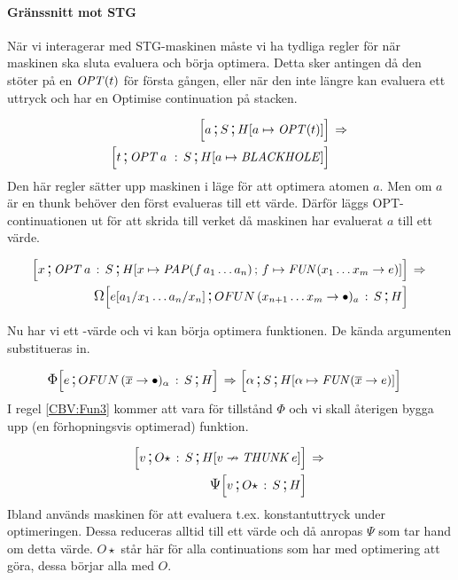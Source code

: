 \documentclass[../Optimise]{subfiles}
\begin{document}
\paragraph{Gränssnitt mot STG}
När vi interagerar med STG-maskinen måste vi ha tydliga regler
för när maskinen ska sluta evaluera och börja optimera. Detta sker
antingen då den stöter på en $\OPT t$ för första gången, eller när den
inte längre kan evaluera ett uttryck och har en Optimise continuation
på stacken.

\begin{align}
\mc aS{\heap a{\OPT t}} & \rulesep\\
\mc t{\cOPT{a\,}S}{\heap a{\BH}} \nonumber
\end{align}
Den här regler sätter upp maskinen i läge för att optimera atomen $a$. Men om $a$
är en thunk behöver den först evalueras till ett värde. Därför läggs
OPT-continuationen ut för att skrida till verket då maskinen har evaluerat
$a$ till ett värde.

\begin{align}
\mc x{\cOPT aS}{\heapp x{\PAP f{a_{1}\ldots a_{n}}}f{\FUN{x_{1}\ldots x_{m}}e}} & \rulesep\\
\OMEGA{\cOFUN{x_{n+1}\ldots x_{m}}aS}H{e[a_{1}/x_{1}\ldots a_{n}/x_{n}]} \nonumber
\end{align}

Nu har vi ett -värde och vi kan börja optimera funktionen. De kända 
argumenten substitueras in.

\begin{align}
\label{CBV:Fun3} \IRR{\cOFUN{\many{x}}{\alpha}S}He  \rulesep &\, \mc{\alpha}S{\heap{\alpha}{\FUN{\many{x}}e}}
\end{align}
 I regel \eqref{CBV:Fun3} kommer att vara för tillstånd
 $\Phi$ och vi skall återigen bygga upp (en förhopningsvis optimerad) funktion.

\begin{align}
\mc v{O\star\,:\, S}{\nheap v{\THUNK e}} & \rulesep\\
\PSI{O\star\,:\, S}Hv \nonumber
\end{align}
Ibland används maskinen för att evaluera t.ex. konstantuttryck under optimeringen.
Dessa reduceras alltid till ett värde och då anropas $\Psi$ som tar hand 
om detta värde. $O\star$ står här för alla continuations som har med optimering
att göra, dessa börjar alla med $O$.
\end{document}

